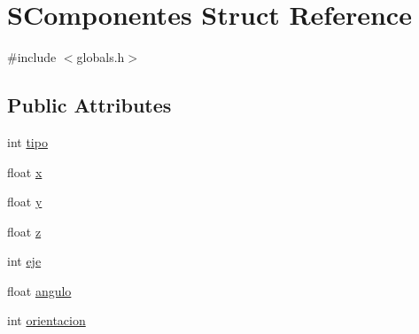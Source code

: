 \hypertarget{struct_s_componentes}{\section{S\-Componentes Struct Reference}
\label{struct_s_componentes}
}


{\ttfamily \#include $<$globals.\-h$>$}

\subsection*{Public Attributes}
\begin{DoxyCompactItemize}
\item 
int \hyperlink{struct_s_componentes_aae650557a98ffa5aa86364ccbe86782b}{tipo}
\item 
float \hyperlink{struct_s_componentes_a167de81f87ee6114396f6532f8c20da5}{x}
\item 
float \hyperlink{struct_s_componentes_a55baedc301b10640f4f52bbd2bb6a089}{y}
\item 
float \hyperlink{struct_s_componentes_aafa661af95040f61d3137d608c4a5608}{z}
\item 
int \hyperlink{struct_s_componentes_a9c07e6918575bb81aa6ffb9facca753f}{eje}
\item 
float \hyperlink{struct_s_componentes_a819f738b83b9b0dd910ee9467eb23453}{angulo}
\item 
int \hyperlink{struct_s_componentes_ab0b787af546cfe4426367c9dc51cad02}{orientacion}
\end{DoxyCompactItemize}


